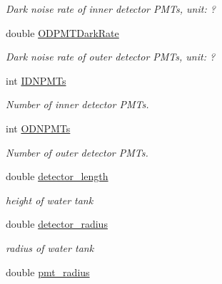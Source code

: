 \begin{DoxyCompactItemize}
\begin{DoxyCompactList}\small\item\em Dark noise rate of inner detector P\-M\-Ts, unit\-: ? \end{DoxyCompactList}\item 
\hypertarget{classDataModel_a30c2323b27be73a78886b527c8b43b30}{double \hyperlink{classDataModel_a30c2323b27be73a78886b527c8b43b30}{O\-D\-P\-M\-T\-Dark\-Rate}}\label{classDataModel_a30c2323b27be73a78886b527c8b43b30}

\begin{DoxyCompactList}\small\item\em Dark noise rate of outer detector P\-M\-Ts, unit\-: ? \end{DoxyCompactList}\item 
\hypertarget{classDataModel_a136ac1e3b7197b8d77ce09280ff38110}{int \hyperlink{classDataModel_a136ac1e3b7197b8d77ce09280ff38110}{I\-D\-N\-P\-M\-Ts}}\label{classDataModel_a136ac1e3b7197b8d77ce09280ff38110}

\begin{DoxyCompactList}\small\item\em Number of inner detector P\-M\-Ts. \end{DoxyCompactList}\item 
\hypertarget{classDataModel_a59c6f8afcab3b346d18d97b715763c1f}{int \hyperlink{classDataModel_a59c6f8afcab3b346d18d97b715763c1f}{O\-D\-N\-P\-M\-Ts}}\label{classDataModel_a59c6f8afcab3b346d18d97b715763c1f}

\begin{DoxyCompactList}\small\item\em Number of outer detector P\-M\-Ts. \end{DoxyCompactList}\item 
\hypertarget{classDataModel_ac64cb381d1cd620bcf8ecff268dc18e0}{double \hyperlink{classDataModel_ac64cb381d1cd620bcf8ecff268dc18e0}{detector\-\_\-length}}\label{classDataModel_ac64cb381d1cd620bcf8ecff268dc18e0}

\begin{DoxyCompactList}\small\item\em height of water tank \end{DoxyCompactList}\item 
\hypertarget{classDataModel_a2177924e78852c71c372749fffa1137d}{double \hyperlink{classDataModel_a2177924e78852c71c372749fffa1137d}{detector\-\_\-radius}}\label{classDataModel_a2177924e78852c71c372749fffa1137d}

\begin{DoxyCompactList}\small\item\em radius of water tank \end{DoxyCompactList}\item 
\hypertarget{classDataModel_a33c62502670e975cbc0e9ed6f0afa22f}{double \hyperlink{classDataModel_a33c62502670e975cbc0e9ed6f0afa22f}{pmt\-\_\-radius}}\label{classDataModel_a33c62502670e975cbc0e9ed6f0afa22f}


\end{DoxyCompactItemize}
